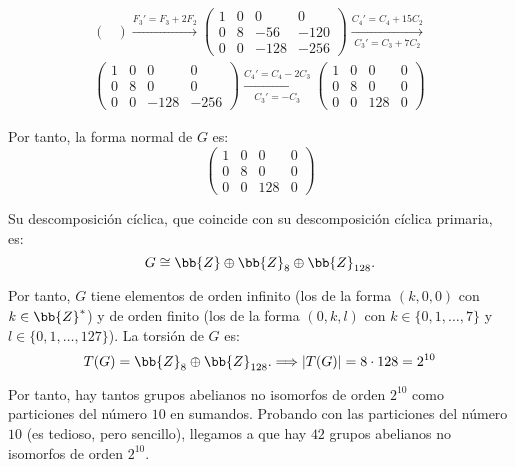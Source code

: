 \begin{ejercicio}
\begin{multline*}
\begin{pmatrix}
        \end{pmatrix}
        \xrightarrow{F_3'=F_3+2F_2}
        \begin{pmatrix}
            1 & 0 & 0 & 0 \\
            0 & 8 & -56 & -120 \\
            0 & 0 & -128 & -256
        \end{pmatrix}
        \xrightarrow[C_3'=C_3+7C_2]{C_4'=C_4+15C_2}\\
        \begin{pmatrix}
            1 & 0 & 0 & 0 \\
            0 & 8 & 0 & 0 \\
            0 & 0 & -128 & -256
        \end{pmatrix}
        \xrightarrow[C_3'=-C_3]{C_4'=C_4-2C_3}
        \begin{pmatrix}
            1 & 0 & 0 & 0 \\
            0 & 8 & 0 & 0 \\
            0 & 0 & 128 & 0
        \end{pmatrix}
    \end{multline*}

    Por tanto, la forma normal de $G$ es:
    \begin{equation*}
        \begin{pmatrix}
            1 & 0 & 0 & 0 \\
            0 & 8 & 0 & 0 \\
            0 & 0 & 128 & 0
        \end{pmatrix}
    \end{equation*}

    Su descomposición cíclica, que coincide con su descomposición cíclica primaria, es:
    \begin{equation*}
        G \cong \bb{Z} \oplus \bb{Z}_8 \oplus \bb{Z}_{128}.
    \end{equation*}

    Por tanto, $G$ tiene elementos de orden infinito (los de la forma $(k, 0, 0)$ con $k\in \bb{Z}^*$) y de orden finito (los de la forma $(0, k, l)$ con $k\in \{0, 1, \ldots, 7\}$ y $l\in \{0, 1, \ldots, 127\}$).
    La torsión de $G$ es:
    \begin{equation*}
        T(G) = \bb{Z}_8 \oplus \bb{Z}_{128}.
        \Longrightarrow |T(G)| = 8\cdot 128 = 2^{10}
    \end{equation*}

    Por tanto, hay tantos grupos abelianos no isomorfos de orden $2^{10}$ como particiones del número $10$ en sumandos. Probando con las particiones del número $10$ (es tedioso, pero sencillo), llegamos a que hay $42$ grupos abelianos no isomorfos de orden $2^{10}$. 
\end{ejercicio}

